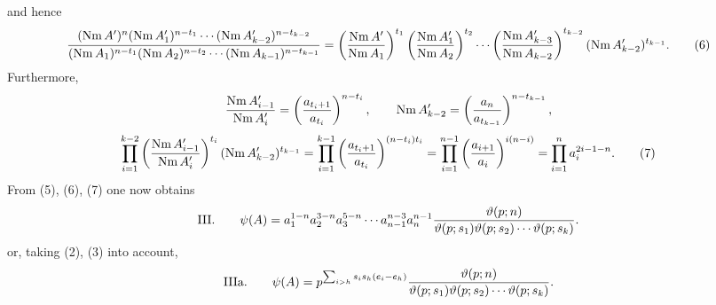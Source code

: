 \documentclass[11pt,a4paper]{article}
\newcommand{\Nm}{\operatorname{Nm}}
\newcommand{\tht}{\vartheta}
\begin{document}
and hence
\begin{equation}
 { (\Nm A')^n(\Nm A_1')^{n-t_1}\cdots(\Nm A_{k-2}')^{n-t_{k-2}}
 \over
 (\Nm A_1)^{n-t_1}(\Nm A_2)^{n-t_2}\cdots(\Nm A_{k-1})^{n-t_{k-1}} }
 =\left({\Nm A'\over\Nm A_1}\right)^{t_1}
 \left({\Nm A_1'\over\Nm A_2}\right)^{t_2}
 \cdots
 \left({\Nm A_{k-3}'\over\Nm A_{k-2}}\right)^{t_{k-2}}
 (\Nm A_{k-2}')^{t_{k-1}}.
\tag{6}
\end{equation}
Furthermore,
\[
 {\Nm A_{i-1}'\over\Nm A_i'}=\left({a_{t_i+1}\over a_{t_i}}\right)^{n-t_i},
 \qquad
 \Nm A_{k-2}'=\left({a_n\over a_{t_{k-1}}}\right)^{n-t_{k-1}},
\]
\begin{equation}
 \prod_{i=1}^{k-2}\left({\Nm A_{i-1}'\over\Nm A_i'}\right)^{t_i}
 (\Nm A_{k-2}')^{t_{k-1}}
 =\prod_{i=1}^{k-1}\left({a_{t_i+1}\over a_{t_i}}\right)^{(n-t_i)t_i}
 =\prod_{i=1}^{n-1}\left({a_{i+1}\over a_i}\right)^{i(n-i)}
 =\prod_{i=1}^n a_i^{2i-1-n}.
\tag{7}
\end{equation}
From (5), (6), (7) one now obtains
\[
\text{III.}\qquad
 \psi(A)=a_1^{1-n}a_2^{3-n}a_3^{5-n}\cdots a_{n-1}^{n-3}a_n^{n-1}
 {\tht(p;n)\over\tht(p;s_1)\tht(p;s_2)\cdots\tht(p;s_k)}.
\]
or, taking (2), (3) into account,
\[
\text{IIIa.}\qquad
 \psi(A)=p^{\sum_{i>h}s_i s_h(e_i-e_h)}
 {\tht(p;n)\over\tht(p;s_1)\tht(p;s_2)\cdots\tht(p;s_k)}.
\]
\end{document}
